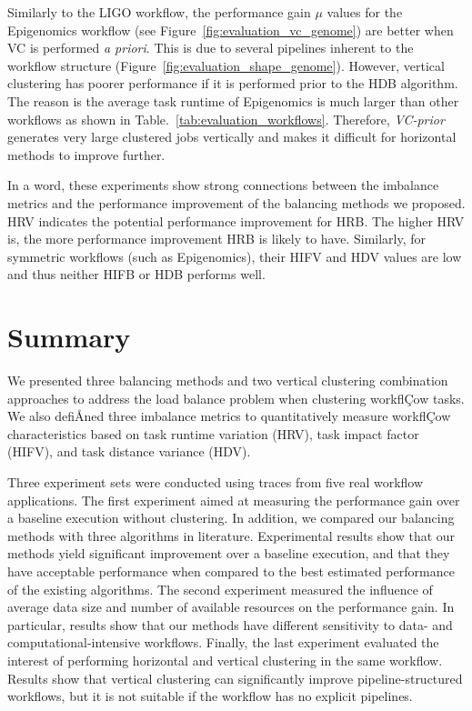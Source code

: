 Similarly to the LIGO workflow, the performance gain $\mu$ values for the Epigenomics workflow (see Figure~\ref{fig:evaluation_vc_genome}) are better when VC is performed \emph{a priori}. This is due to several pipelines inherent to the workflow structure (Figure~\ref{fig:evaluation_shape_genome}). However, vertical clustering has poorer performance if it is performed prior to the HDB algorithm. The reason is the average task runtime of Epigenomics is much larger than other workflows as shown in Table.~\ref{tab:evaluation_workflows}. Therefore, \emph{VC-prior} generates very large clustered jobs vertically and makes it difficult for horizontal methods to improve further. 


In a word, these experiments show strong connections between the imbalance metrics and the performance improvement of the balancing methods we proposed. HRV indicates the potential performance improvement for HRB. The higher HRV is, the more performance improvement HRB is likely to have. Similarly, for symmetric workflows (such as Epigenomics), their HIFV and HDV values are low and thus neither HIFB or HDB performs well. 




\section{Summary}

We presented three balancing methods and two vertical clustering combination approaches to address the load balance problem when clustering workflÇow tasks. We also defiÅned three imbalance metrics to quantitatively measure workflÇow characteristics based on task runtime variation (HRV), task impact factor (HIFV), and task distance variance (HDV).

Three experiment sets were conducted using traces from five real workflow applications. The first experiment aimed at measuring the performance gain over a baseline execution without clustering. In addition, we compared our balancing methods with three algorithms in literature. Experimental results show that our methods yield significant improvement over a baseline execution, and that they have acceptable performance when compared to the best estimated performance of the existing algorithms. The second experiment measured the influence of average data size and number of available resources on the performance gain. In particular, results show that our methods have different sensitivity to data- and computational-intensive workflows. Finally, the last experiment evaluated the interest of performing horizontal and vertical clustering in the same workflow. Results show that vertical clustering can significantly improve pipeline-structured workflows, but it is not suitable if the workflow has no explicit pipelines.

